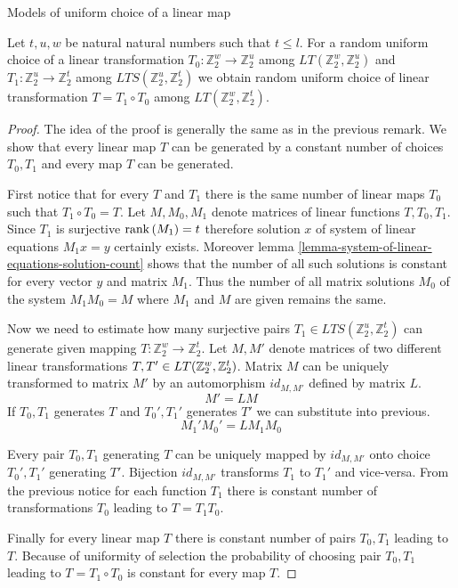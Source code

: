 \begin{section}{Models of uniform choice of a linear map}
\begin{remark}
\label{remark-model-uniform-linear-map-selection}
Let $t, u, w$ be natural natural numbers such that $t \leq l$. For a random uniform choice of a linear transformation $T_0: \mathbb{Z}_2^w \rightarrow \mathbb{Z}_2^u$ among $LT(\mathbb{Z}_2^w, \mathbb{Z}_2^u)$ and $T_1: \mathbb{Z}_2^u \rightarrow \mathbb{Z}_2^t$ among $LTS(\mathbb{Z}_2^u, \mathbb{Z}_2^t)$ we obtain random uniform choice of linear transformation $T = T_1 \circ T_0$ among $LT(\mathbb{Z}_2^w, \mathbb{Z}_2^t)$.
\end{remark}
\begin{proof}
The idea of the proof is generally the same as in the previous remark. We show that every linear map $T$ can be generated by a constant number of choices $T_0, T_1$ and every map $T$ can be generated.

First notice that for every $T$ and $T_1$ there is the same number of linear maps $T_0$ such that $T_1 \circ T_0 = T$. Let $M, M_0, M_1$ denote matrices of linear functions $T, T_0, T_1$. Since $T_1$ is surjective $\mathrm{rank}\left({M_1}\right) = t$ therefore solution $x$ of system of linear equations $M_1 x = y$ certainly exists. Moreover lemma \ref{lemma-system-of-linear-equations-solution-count} shows that the number of all such solutions is constant for every vector $y$ and matrix $M_1$. Thus the number of all matrix solutions $M_0$ of the system $M_1 M_0 = M$ where $M_1$ and $M$ are given remains the same.

Now we need to estimate how many surjective pairs $T_1 \in LTS(\mathbb{Z}_2^u, \mathbb{Z}_2^t)$ can generate given mapping $T: \mathbb{Z}_2^w \rightarrow \mathbb{Z}_2^t$. Let $M, M'$ denote matrices of two different linear transformations $T, T' \in LT(\mathbb{Z}_{2}^{w}, \mathbb{Z}_{2}^{t})$. Matrix $M$ can be uniquely transformed to matrix $M'$ by an automorphism $id_{M, M'}$ defined by matrix $L$.
\[
	M' = LM
\]
If $T_0, T_1$ generates $T$ and $T_0', T_1'$ generates $T'$ we can substitute into previous.
\[
	M_1' M_0' = L M_1 M_0
\]

Every pair $T_0, T_1$ generating $T$ can be uniquely mapped by $id_{M, M'}$ onto choice $T_0', T_1'$ generating $T'$. Bijection $id_{M, M'}$ transforms $T_1$ to $T_1'$ and vice-versa. From the previous notice for each function $T_1$ there is constant number of transformations $T_0$ leading to $T = T_1 T_0$.

Finally for every linear map $T$ there is constant number of pairs $T_0, T_1$ leading to $T$. Because of uniformity of selection the probability of choosing pair $T_0, T_1$ leading to $T = T_1 \circ T_0$ is constant for every map $T$.
\end{proof}
\end{section}
